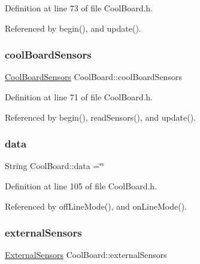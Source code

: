 Definition at line 73 of file Cool\+Board.\+h.



Referenced by begin(), and update().

\mbox{\label{classCoolBoard_af102be5288bd7f7a8e59b13f86e26a00}} 
\subsubsection{\texorpdfstring{cool\+Board\+Sensors}{coolBoardSensors}}
{\footnotesize\ttfamily \hyperlink{classCoolBoardSensors}{Cool\+Board\+Sensors} Cool\+Board\+::cool\+Board\+Sensors\hspace{0.3cm}{\ttfamily [private]}}



Definition at line 71 of file Cool\+Board.\+h.



Referenced by begin(), read\+Sensors(), and update().

\mbox{\label{classCoolBoard_a427fb753dd8575bdf821c70a5c63d695}} 
\subsubsection{\texorpdfstring{data}{data}}
{\footnotesize\ttfamily String Cool\+Board\+::data =\char`\"{}\char`\"{}\hspace{0.3cm}{\ttfamily [private]}}



Definition at line 105 of file Cool\+Board.\+h.



Referenced by off\+Line\+Mode(), and on\+Line\+Mode().

\mbox{\label{classCoolBoard_a09e26264839c65873eb56af476eff6b2}} 
\subsubsection{\texorpdfstring{external\+Sensors}{externalSensors}}
{\footnotesize\ttfamily \hyperlink{classExternalSensors}{External\+Sensors} Cool\+Board\+::external\+Sensors\hspace{0.3cm}{\ttfamily [private]}}



